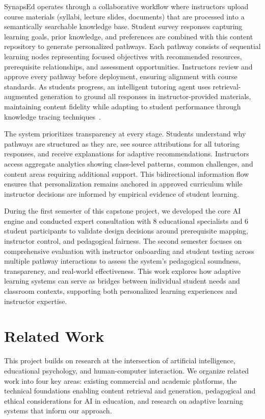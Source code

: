 \documentclass{stylefiles/capstone}
\begin{document}
SynapsEd operates through a collaborative workflow where instructors upload course materials (syllabi, lecture slides, documents) that are processed into a semantically searchable knowledge base. Student survey responses capturing learning goals, prior knowledge, and preferences are combined with this content repository to generate personalized pathways. Each pathway consists of sequential learning nodes representing focused objectives with recommended resources, prerequisite relationships, and assessment opportunities. Instructors review and approve every pathway before deployment, ensuring alignment with course standards. As students progress, an intelligent tutoring agent uses retrieval-augmented generation to ground all responses in instructor-provided materials, maintaining content fidelity while adapting to student performance through knowledge tracing techniques~\cite{10933562}.

The system prioritizes transparency at every stage. Students understand why pathways are structured as they are, see source attributions for all tutoring responses, and receive explanations for adaptive recommendations. Instructors access aggregate analytics showing class-level patterns, common challenges, and content areas requiring additional support. This bidirectional information flow ensures that personalization remains anchored in approved curriculum while instructor decisions are informed by empirical evidence of student learning.

During the first semester of this capstone project, we developed the core AI engine and conducted expert consultation with 8 educational specialists and 6 student participants to validate design decisions around prerequisite mapping, instructor control, and pedagogical fairness. The second semester focuses on comprehensive evaluation with instructor onboarding and student testing across multiple pathway interactions to assess the system's pedagogical soundness, transparency, and real-world effectiveness. This work explores how adaptive learning systems can serve as bridges between individual student needs and classroom contexts, supporting both personalized learning experiences and instructor expertise.

\section{Related Work}

This project builds on research at the intersection of artificial intelligence, educational psychology, and human-computer interaction. We organize related work into four key areas: existing commercial and academic platforms, the technical foundations enabling content retrieval and generation, pedagogical and ethical considerations for AI in education, and research on adaptive learning systems that inform our approach.
\end{document}
